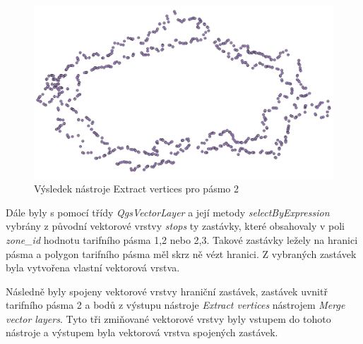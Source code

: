\begin{figure}[H] \centering
    \includegraphics[width=400pt]{./pictures/vertices.png}
    \caption[Výsledek nástroje Extract vertices pro pásmo 2]{Výsledek nástroje Extract vertices pro pásmo 2}
	\label{fig:vertices}              
\end{figure} 

Dále byly s pomocí třídy \textit{QgsVectorLayer} a její metody \textit{selectByExpression} vybrány 
z původní vektorové vrstvy \textit{stops} ty zastávky, které obsahovaly v poli \textit{zone\_id}
hodnotu tarifního pásma 1,2 nebo 2,3. Takové zastávky ležely na hranici pásma a polygon tarifního pásma
měl skrz ně vézt hranici. Z vybraných zastávek byla vytvořena vlastní vektorová vrstva. 

Následně byly spojeny vektorové vrstvy hraniční zastávek, zastávek uvnitř tarifního pásma 2 a
bodů z výstupu nástroje \textit{Extract vertices} nástrojem \textit{Merge vector layers}.
Tyto tři zmiňované vektorové vrstvy byly vstupem do tohoto nástroje a výstupem byla 
vektorová vrstva spojených zastávek. 


